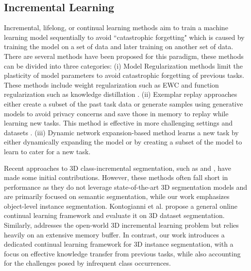 \subsection{Incremental Learning}
 Incremental, lifelong, or continual learning methods aim to train a machine learning model sequentially to avoid ``catastrophic forgetting" which is caused by training the model on a set of data and later training on another set of data. There are several methods have been proposed for this paradigm, these methods can be divided into three categories: (i) Model Regularization \cite{kirkpatrick2017overcoming, aljundi2018memory, li2017learning} methods limit the plasticity of model parameters to avoid catastrophic forgetting of previous tasks. These methods include weight regularization such as EWC \cite{serra2018overcoming} and function regularization such as knowledge distillation \cite{hinton2015distilling}. (ii) Exemplar replay approaches either create a subset of the past task data or generate samples using generative models to avoid privacy concerns and save those in memory to replay while learning new tasks. This method is effective in more challenging settings and datasets \cite{rebuffi2017icarl,kamra2017deep, buzzega2020dark, cha2021co2l}. (iii) Dynamic network expansion-based method learns a new task by either dynamically expanding the model \cite{rusu2016progressive, li2019learn, zhao2022deep} or by creating a subset of the model \cite{zhao2022deep, wang2020learn,ke2020continual, rajasegaran2019random} to learn to cater for a new task. 

Recent approaches to 3D class-incremental segmentation, such as \cite{Yang_2023_CVPR} and \cite{su2024balanced}, have made some initial contributions. However, these methods often fall short in performance as they do not leverage state-of-the-art 3D segmentation models and are primarily focused on semantic segmentation, while our work emphasizes object-level instance segmentation. Kontogianni et al. \cite{kontogianni2024continual} propose a general online continual learning framework and evaluate it on 3D dataset segmentation. Similarly, \cite{boudjoghra20243d} addresses the open-world 3D incremental learning problem but relies heavily on an extensive memory buffer. 
In contrast, our work introduces a dedicated continual learning framework for 3D instance segmentation, with a focus on effective knowledge transfer from previous tasks, while also accounting for the challenges posed by infrequent class occurrences.
